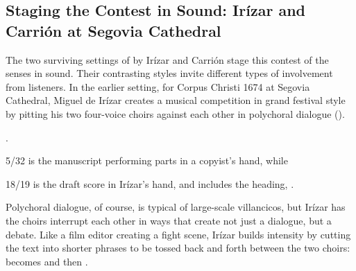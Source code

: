 \subsection{Staging the Contest in Sound: Irízar and Carrión at Segovia 
Cathedral}


The two surviving settings of  by Irízar and Carrión 
stage this contest of the senses in sound.
Their contrasting styles invite different types of involvement from listeners.
In the earlier setting, for Corpus Christi 1674 at Segovia Cathedral, Miguel de 
Irízar creates a musical competition in grand festival style by pitting his two 
four-voice choirs against each other in polychoral dialogue 
().%
\begin{Footnote}
    \Autocite{Cashner:SingingAboutSingingI}.
    \signature{E-SE}{5/32} is the manuscript performing parts in a copyist's 
    hand, while \signature{E-SE}{18/19} is the draft score in Irízar's hand, and 
    includes the heading, .
\end{Footnote}
Polychoral dialogue, of course, is typical of large-scale villancicos, but 
Irízar has the choirs interrupt each other in ways that create not just a 
dialogue, but a debate.
Like a film editor creating a fight scene, Irízar builds intensity by cutting 
the text into shorter phrases to be tossed back and forth between the two 
choirs:  becomes  and then 
.


